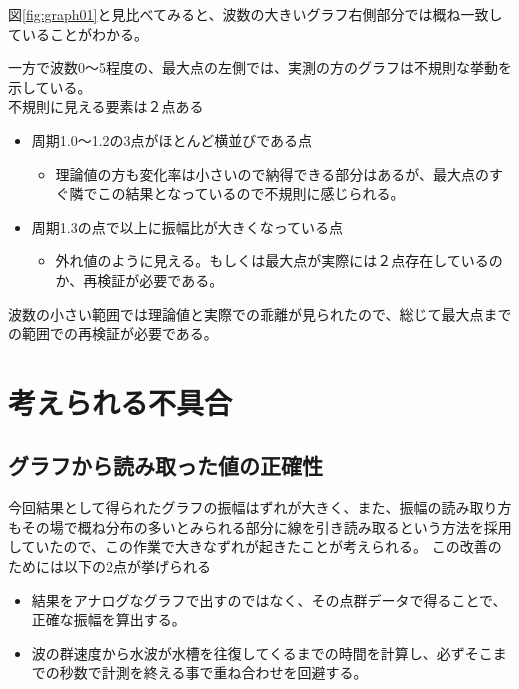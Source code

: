\documentclass[dvipdfmx,a4paper]{jreport} %
\begin{document}
図\ref{fig:graph01}と見比べてみると、波数の大きいグラフ右側部分では概ね一致していることがわかる。

一方で波数0～5程度の、最大点の左側では、実測の方のグラフは不規則な挙動を示している。\\不規則に見える要素は２点ある
\begin{itemize}
    \item 周期1.0～1.2の3点がほとんど横並びである点
    \begin{itemize}
        \item 理論値の方も変化率は小さいので納得できる部分はあるが、最大点のすぐ隣でこの結果となっているので不規則に感じられる。
    \end{itemize}
    \item 周期1.3の点で以上に振幅比が大きくなっている点
    \begin{itemize}
        \item 外れ値のように見える。もしくは最大点が実際には２点存在しているのか、再検証が必要である。
    \end{itemize}
\end{itemize}
波数の小さい範囲では理論値と実際での乖離が見られたので、総じて最大点までの範囲での再検証が必要である。

\section{考えられる不具合}
\subsection{グラフから読み取った値の正確性}
今回結果として得られたグラフの振幅はずれが大きく、また、振幅の読み取り方もその場で概ね分布の多いとみられる部分に線を引き読み取るという方法を採用していたので、この作業で大きなずれが起きたことが考えられる。
この改善のためには以下の2点が挙げられる
\begin{itemize}
    \item 結果をアナログなグラフで出すのではなく、その点群データで得ることで、正確な振幅を算出する。
    \item 波の群速度から水波が水槽を往復してくるまでの時間を計算し、必ずそこまでの秒数で計測を終える事で重ね合わせを回避する。
\end{itemize}
\end{document}
